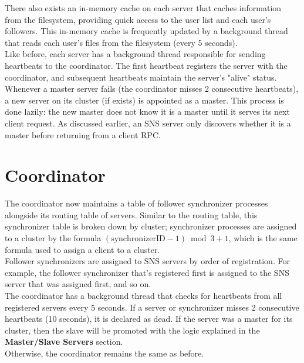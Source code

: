 \documentclass{article}
\begin{document}
There also exists an in-memory cache on each server that caches information from the filesystem, providing quick access to the user list and each user's followers. This in-memory cache is frequently updated by a background thread that reads each user's files from the filesystem (every 5 seconds).\\

Like before, each server has a background thread responsible for sending heartbeats to the coordinator. The first heartbeat registers the server with the coordinator, and subsequent heartbeats maintain the server's "alive" status.\\

Whenever a master server fails (the coordinator misses 2 consecutive heartbeats), a new server on its cluster (if exists) is appointed as a master. This process is done lazily: the new master does not know it is a master until it serves its next client request. As discussed earlier, an SNS server only discovers whether it is a master before returning from a client RPC.\\

\section{Coordinator}

The coordinator now maintains a table of follower synchronizer processes alongside its routing table of servers. Similar to the routing table, this synchronizer table is broken down by cluster; synchronizer processes are assigned to a cluster by the formula $(\text{synchronizerID} - 1) \bmod 3 + 1$, which is the same formula used to assign a client to a cluster.\\

Follower synchronizers are assigned to SNS servers by order of registration. For example, the follower synchronizer that's registered first is assigned to the SNS server that was assigned first, and so on.\\

The coordinator has a background thread that checks for heartbeats from all registered servers every 5 seconds. If a server or synchronizer misses 2 consecutive heartbeats (10 seconds), it is declared as dead. If the server was a master for its cluster, then the slave will be promoted with the logic explained in the \textbf{Master/Slave Servers} section.\\

Otherwise, the coordinator remains the same as before.\\
\end{document}
